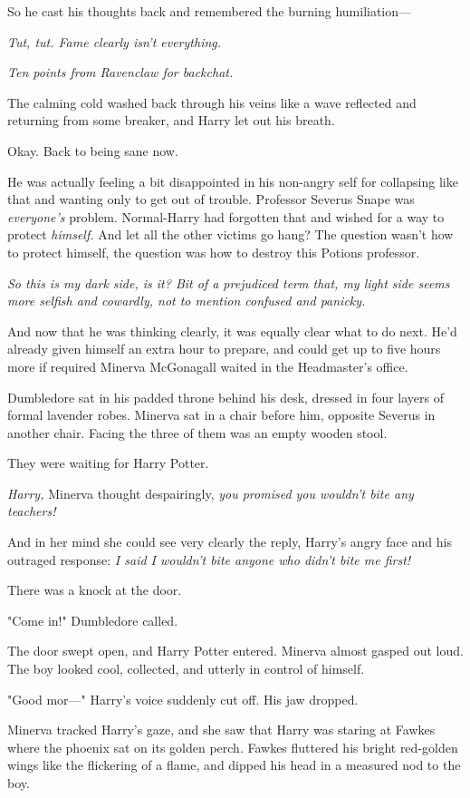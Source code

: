 So he cast his thoughts back and remembered the burning humiliation---

\emph{Tut, tut. Fame clearly isn't everything.}

\emph{Ten points from Ravenclaw for backchat.}

The calming cold washed back through his veins like a wave reflected and
returning from some breaker, and Harry let out his breath.

Okay. Back to being sane now.

He was actually feeling a bit disappointed in his non-angry self for collapsing
like that and wanting only to get out of trouble. Professor Severus Snape was
\emph{everyone's} problem. Normal-Harry had forgotten that and wished for a way
to protect \emph{himself.} And let all the other victims go hang? The question
wasn't how to protect himself, the question was how to destroy this Potions
professor.

\emph{So this is my dark side, is it? Bit of a prejudiced term that, my light
side seems more selfish and cowardly, not to mention confused and panicky.}

And now that he was thinking clearly, it was equally clear what to do next.
He'd already given himself an extra hour to prepare, and could get up to five
hours more if required{\el}
\sbreak
Minerva McGonagall waited in the Headmaster's office.

Dumbledore sat in his padded throne behind his desk, dressed in four layers of
formal lavender robes. Minerva sat in a chair before him, opposite Severus in
another chair. Facing the three of them was an empty wooden stool.

They were waiting for Harry Potter.

\emph{Harry,} Minerva thought despairingly, \emph{you promised you wouldn't
bite any teachers!}

And in her mind she could see very clearly the reply, Harry's angry face and
his outraged response: \emph{I said I wouldn't bite anyone who didn't bite me
first!}

There was a knock at the door.

"Come in!" Dumbledore called.

The door swept open, and Harry Potter entered. Minerva almost gasped out loud.
The boy looked cool, collected, and utterly in control of himself.

"Good mor\mbox{---}" Harry's voice suddenly cut off. His jaw dropped.

Minerva tracked Harry's gaze, and she saw that Harry was staring at Fawkes
where the phoenix sat on its golden perch. Fawkes fluttered his bright
red-golden wings like the flickering of a flame, and dipped his head in a
measured nod to the boy.

